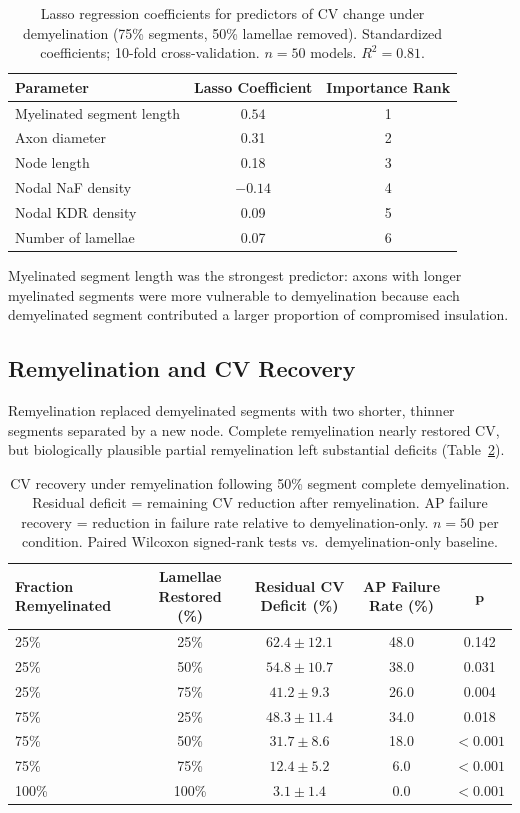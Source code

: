 \documentclass[11pt]{article}
\begin{document}
\begin{table}[H]
\centering
\caption{Lasso regression coefficients for predictors of CV change under demyelination (75\% segments, 50\% lamellae removed). Standardized coefficients; 10-fold cross-validation. $n = 50$ models. $R^2 = 0.81$.}
\label{tab:lasso}
\begin{tabular}{lcc}
\toprule
\textbf{Parameter} & \textbf{Lasso Coefficient} & \textbf{Importance Rank} \\
\midrule
Myelinated segment length & $\mathbf{0.54}$ & 1 \\
Axon diameter & 0.31 & 2 \\
Node length & 0.18 & 3 \\
Nodal NaF density & $-0.14$ & 4 \\
Nodal KDR density & 0.09 & 5 \\
Number of lamellae & 0.07 & 6 \\
\bottomrule
\end{tabular}
\end{table}

Myelinated segment length was the strongest predictor: axons with longer myelinated segments were more vulnerable to demyelination because each demyelinated segment contributed a larger proportion of compromised insulation.

\subsection{Remyelination and CV Recovery}

Remyelination replaced demyelinated segments with two shorter, thinner segments separated by a new node. Complete remyelination nearly restored CV, but biologically plausible partial remyelination left substantial deficits (Table~\ref{tab:remyelin}).

\begin{table}[H]
\centering
\caption{CV recovery under remyelination following 50\% segment complete demyelination. Residual deficit = remaining CV reduction after remyelination. AP failure recovery = reduction in failure rate relative to demyelination-only. $n = 50$ per condition. Paired Wilcoxon signed-rank tests vs.\ demyelination-only baseline.}
\label{tab:remyelin}
\begin{tabular}{lcccc}
\toprule
\textbf{Fraction Remyelinated} & \textbf{Lamellae Restored (\%)} & \textbf{Residual CV Deficit (\%)} & \textbf{AP Failure Rate (\%)} & $\boldsymbol{p}$ \\
\midrule
25\% & 25\% & $62.4 \pm 12.1$ & 48.0 & 0.142 \\
25\% & 50\% & $54.8 \pm 10.7$ & 38.0 & 0.031 \\
25\% & 75\% & $41.2 \pm 9.3$ & 26.0 & 0.004 \\
75\% & 25\% & $48.3 \pm 11.4$ & 34.0 & 0.018 \\
75\% & 50\% & $31.7 \pm 8.6$ & 18.0 & $< 0.001$ \\
75\% & 75\% & $12.4 \pm 5.2$ & 6.0 & $< 0.001$ \\
100\% & 100\% & $\mathbf{3.1 \pm 1.4}$ & 0.0 & $< 0.001$ \\
\bottomrule
\end{tabular}
\end{table}
\end{document}
